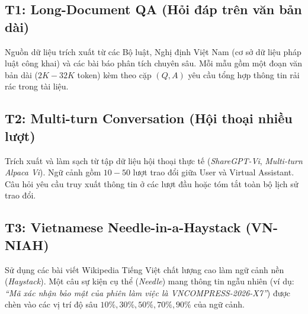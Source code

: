 \documentclass[12pt,a4paper]{article}
\newcommand{\method}[1]{\textsc{#1}}
\newcommand{\viet}[1]{\textit{#1}}
\begin{document}
\begin{table}[H]
\centering
\caption{Tổng quan 5 tác vụ trong bộ dữ liệu \method{VCC-Bench}.}
\label{tab:vcc_tasks}
\end{table}

\subsection{T1: Long-Document QA (Hỏi đáp trên văn bản dài)}
Nguồn dữ liệu trích xuất từ các Bộ luật, Nghị định Việt Nam (cơ sở dữ liệu pháp luật công khai) và các bài báo phân tích chuyên sâu. Mỗi mẫu gồm một đoạn văn bản dài ($2K - 32K$ token) kèm theo cặp $(Q, A)$ yêu cầu tổng hợp thông tin rải rác trong tài liệu.

\subsection{T2: Multi-turn Conversation (Hội thoại nhiều lượt)}
Trích xuất và làm sạch từ tập dữ liệu hội thoại thực tế (\viet{ShareGPT-Vi}, \viet{Multi-turn Alpaca Vi}). Ngữ cảnh gồm $10 - 50$ lượt trao đổi giữa User và Virtual Assistant. Câu hỏi yêu cầu truy xuất thông tin ở các lượt đầu hoặc tóm tắt toàn bộ lịch sử trao đổi.

\subsection{T3: Vietnamese Needle-in-a-Haystack (VN-NIAH)}
Sử dụng các bài viết Wikipedia Tiếng Việt chất lượng cao làm ngữ cảnh nền (\textit{Haystack}). Một câu sự kiện cụ thể (\textit{Needle}) mang thông tin ngẫu nhiên (ví dụ: \textit{``Mã xác nhận bảo mật của phiên làm việc là VNCOMPRESS-2026-X7''}) được chèn vào các vị trí độ sâu $10\%, 30\%, 50\%, 70\%, 90\%$ của ngữ cảnh.
\end{document}
